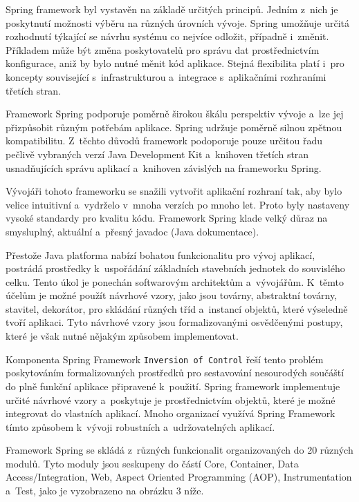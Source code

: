 \documentclass[twoside, 12pt]{article}
\begin{document}
{%
Spring framework byl vystavěn na základě určitých principů.
Jedním z~nich je poskytnutí možnosti výběru na různých úrovních vývoje.
Spring umožňuje určitá rozhodnutí týkající se návrhu systému
co nejvíce odložit, případně i~změnit.
Příkladem může být změna poskytovatelů
pro správu dat prostřednictvím konfigurace,
aniž by bylo nutné měnit kód aplikace.
Stejná flexibilita platí i~pro koncepty související s~infrastrukturou
a~integrace s~aplikačními rozhraními třetích stran.

Framework Spring podporuje poměrně širokou škálu perspektiv vývoje
a~lze jej přizpůsobit různým potřebám aplikace.
Spring udržuje poměrně silnou zpětnou kompatibilitu.
Z~těchto důvodů framework podoporuje pouze určitou řadu
pečlivě vybraných verzí Java Development Kit
a~knihoven třetích stran usnadňujících správu aplikací
a~knihoven závislých na frameworku Spring.

Vývojáři tohoto frameworku se snažili vytvořit aplikační rozhraní tak,
aby bylo velice intuitivní a~vydrželo v~mnoha verzích po mnoho let.
Proto byly nastaveny vysoké standardy pro kvalitu kódu.
Framework Spring klade velký důraz na smysluplný, aktuální a~přesný javadoc
(Java dokumentace).

Přestože Java platforma nabízí bohatou funkcionalitu pro vývoj aplikací,
postrádá prostředky k~uspořádání základních stavebních jednotek do souvislého celku.
Tento úkol je ponechán softwarovým architektům a~vývojářům.
K~těmto účelům je možné použít návrhové vzory, jako jsou továrny, abstraktní továrny,
stavitel, dekorátor, pro skládání různých tříd a~instancí objektů,
které výseledně tvoří aplikaci.
Tyto návrhové vzory jsou formalizovanými osvědčenými postupy,
které je však nutné nějakým způsobem implementovat.

Komponenta Spring Framework \texttt{Inversion of Control} řeší tento problém
poskytováním formalizovaných prostředků pro sestavování nesourodých
součáští do plně funkční aplikace připravené k~použití.
Spring framework implementuje určité návrhové vzory a~poskytuje
je prostřednictvím objektů, které je možné integrovat do vlastních aplikací.
Mnoho organizací využívá Spring Framework tímto způsobem k~vývoji robustních
a~udržovatelných aplikací.

Framework Spring se skládá z~různých funkcionalit organizovaných do 20 různých modulů.
Tyto moduly jsou seskupeny do částí Core, Container, Data Access/Integration,
Web, Aspect Oriented Programming (AOP), Instrumentation a~Test,
jako je vyzobrazeno na obrázku 3 níže.

}
\end{document}
